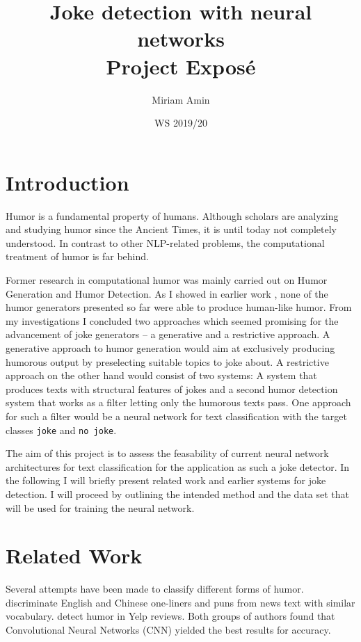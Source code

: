 \documentclass[12pt]{scrartcl}
\title{%
	Joke detection with neural networks \\
	\large Project Exposé}
\author{Miriam Amin}
\date{WS 2019/20}
\begin{document}
\maketitle

\section{Introduction}
Humor is a fundamental property of humans. Although scholars are analyzing and studying humor since the Ancient Times, it is until today not completely understood. In contrast to other NLP-related problems, the computational treatment of humor is far behind. 

Former research in computational humor was mainly carried out on Humor Generation and Humor Detection. As I showed in earlier work \citep{aminComputationalHumorAutomatic2019}, none of the humor generators presented so far were able to produce human-like humor. From my investigations I concluded two approaches which seemed promising for the advancement of joke generators -- a generative and a restrictive approach. A generative approach to humor generation would aim at exclusively producing humorous output by preselecting suitable topics to joke about. A restrictive approach on the other hand would consist of two systems: A system that produces texts with structural features of jokes and a second humor detection system that works as a filter letting only the humorous texts pass.  
One approach for such a filter would be a neural network for text classification with the target classes \texttt{joke} and \texttt{no joke}.

The aim of this project is to assess the feasability of current neural network architectures for text classification for the application as such a joke detector. In the following I will briefly present related work and earlier systems for joke detection. I will proceed by outlining the intended method and the data set that will be used for training the neural network. 

 

\section{Related Work}
Several attempts have been made to classify different forms of humor. \cite{chenHumorRecognitionUsing2018} discriminate English and Chinese one-liners and puns from news text with similar vocabulary. \cite{oliveiraHumorDetectionYelp2015} detect humor in Yelp reviews. Both groups of authors found that Convolutional Neural Networks (CNN) yielded the best results for accuracy. 
\end{document}
